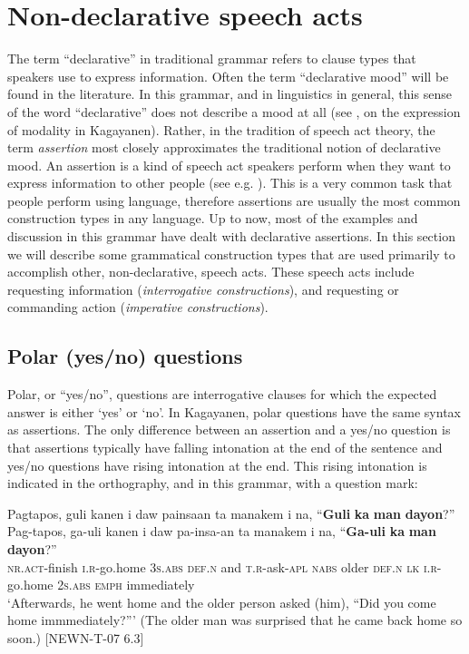 \section{Non-declarative speech acts}
\label{bkm:Ref445900286}
The term “declarative” in traditional grammar refers to clause types that speakers use to express information. Often the term “declarative mood” will be found in the literature. In this grammar, and in linguistics in general, this sense of the word “declarative” does not describe a mood at all (see ,  on the expression of modality in Kagayanen). Rather, in the tradition of speech act theory, the term \textit{assertion} most closely approximates the traditional notion of declarative mood. An assertion is a kind of speech act speakers perform when they want to express information to other people (see e.g. \citealt{searle1969}). This is a very common task that people perform using language, therefore assertions are usually the most common construction types in any language. Up to now, most of the examples and discussion in this grammar have dealt with declarative assertions. In this section we will describe some grammatical construction types that are used primarily to accomplish other, non-declarative, speech acts.  These speech acts include requesting information (\textit{interrogative constructions}), and requesting or commanding action (\textit{imperative constructions}).

\subsection{Polar (yes/no) questions}
\label{bkm:Ref445900289} \label{sec:yesnoquestions}
Polar, or “yes/no”, questions are interrogative clauses for which the expected answer is either ‘yes’ or ‘no’. In Kagayanen, polar questions have the same syntax as assertions. The only difference between an assertion and a yes/no question is that assertions typically have falling intonation at the end of the sentence and yes/no questions have rising intonation at the end. This rising intonation is indicated in the orthography, and in this grammar, with a question mark:

\ea
Pagtapos,  guli  kanen  i  daw  painsaan  ta manakem  i  na,  “\textbf{Guli}  \textbf{ka}  \textbf{man}  \textbf{dayon}?” \\\smallskip
\gll Pag-tapos,  ga-uli  kanen  i  daw  pa-insa-an  ta manakem  i  na,  “\textbf{Ga-uli}  \textbf{ka}  \textbf{man}  \textbf{dayon}?” \\
\textsc{nr.act}-finish  \textsc{i.r}-go.home  3\textsc{s.abs}  \textsc{def.n}  and  \textsc{t.r}-ask-\textsc{apl}  \textsc{nabs}
older  \textsc{def.n}  \textsc{lk}  \textsc{i.r}-go.home  2\textsc{s.abs}  \textsc{emph}  immediately \\
\glt `Afterwards, he went home and the older person asked (him), “Did  you come home immmediately?”' (The older man was surprised that he came back home so soon.) [NEWN-T-07 6.3] 
\z

